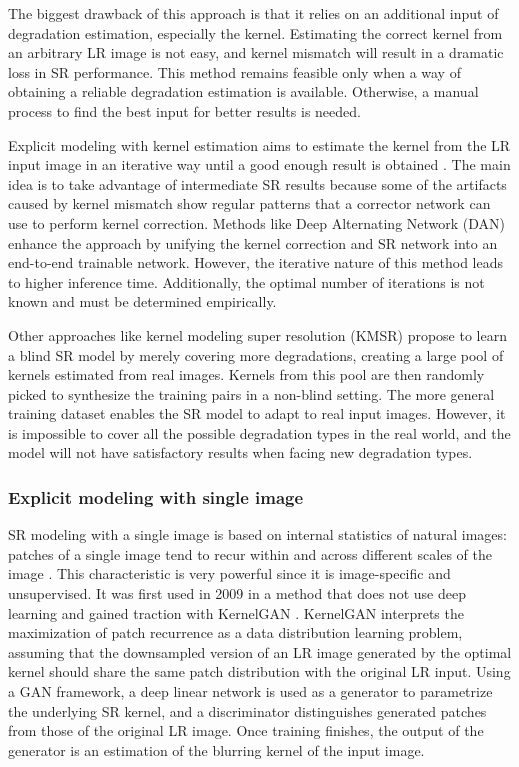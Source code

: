         The biggest drawback of this approach is that it relies on an additional input of degradation estimation, especially the kernel. Estimating the correct kernel from an arbitrary LR image is not easy, and kernel mismatch will result in a dramatic loss in SR performance.
        This method remains feasible only when a way of obtaining a reliable degradation estimation is available.
        Otherwise, a manual process to find the best input for better results is needed.
        
        Explicit modeling with kernel estimation aims to estimate the kernel from the LR input image in an iterative way until a good enough result is obtained \cite{gu2019blind}.
        The main idea is to take advantage of intermediate SR results because some of the artifacts caused by kernel mismatch show regular patterns that a corrector network can use to perform kernel correction.
        Methods like Deep Alternating Network (DAN) \cite{luo2020unfolding} enhance the approach by unifying the kernel correction and SR network into an end-to-end trainable network. 
        However, the iterative nature of this method leads to higher inference time. Additionally, the optimal number of iterations is not known and must be determined empirically.

        Other approaches like kernel modeling super resolution (KMSR) \cite{zhou19}  propose to learn a blind SR model by merely covering more degradations, creating a large pool of kernels estimated from real images.
        Kernels from this pool are then randomly picked to synthesize the training pairs in a non-blind setting. 
        The more general training dataset enables the SR model to adapt to real input images. 
        However, it is impossible to cover all the possible degradation types in the real world, and the model will not have satisfactory results when facing new degradation types.


        \subsubsection{Explicit modeling with single image}

        SR modeling with a single image is based on internal statistics of natural images: patches of a single image tend to recur within and across different scales of the image \cite{zontak2011}.
        This characteristic is very powerful since it is image-specific and unsupervised. It was first used in 2009 in a method that does not use deep learning \cite{glasner2009} and gained traction with KernelGAN \cite{bellkligler2020blind}. 
        KernelGAN interprets the maximization of patch recurrence as a data distribution learning problem, assuming that the downsampled version of an LR image generated by the optimal kernel should share the same patch distribution with the original LR input.
        Using a GAN framework, a deep linear network is used as a generator to parametrize the underlying SR kernel, and a discriminator distinguishes generated patches from those of the original LR image.
        Once training finishes, the output of the generator is an estimation of the blurring kernel of the input image. 

